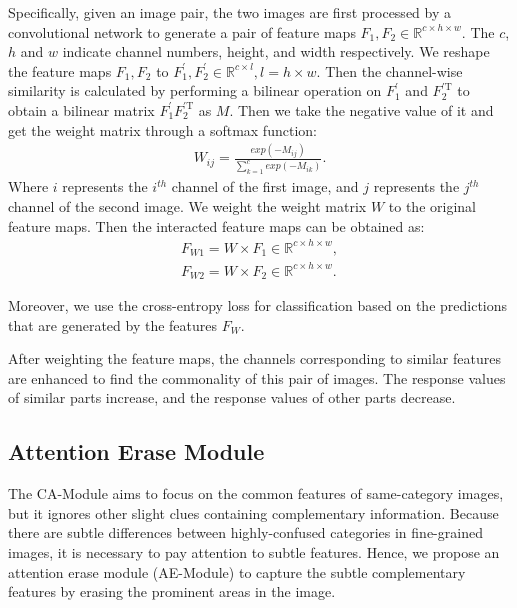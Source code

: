 \documentclass[conference]{IEEEtran}
\begin{document}
Specifically, given an image pair, the two images are first processed by a convolutional network to generate a pair of feature maps ${F_{1}, F_{2}} \in \mathbb{R}^{c\times h\times w}$. The $c$, $h$ and $w$ indicate channel numbers, height, and width respectively. We reshape the feature maps $F_{1}, F_{2}$  to  $F^{'}_{1}, F^{'}_{2}  \in \mathbb{R}^{c \times l},l=h \times w$. Then the channel-wise similarity is calculated by performing a bilinear operation on  $F^{'}_{1} $ and  $ F_{2}^ \mathrm{ 'T } $ to obtain a bilinear matrix $F^{'}_{1} F_{2}^ \mathrm{ 'T } $ as $M$. Then we take the negative value of it and get the weight matrix through a softmax function:
\begin{eqnarray}
W_{ij}=\frac{exp({-M}_{ij})}{\sum_{k=1}^{c} exp({-M}_{ik})}.
\end{eqnarray}
Where $i$ represents the $i^{th}$ channel of the first image, and $j$ represents the $j^{th}$ channel of the second image. We weight the weight matrix $W$ to the original feature maps. Then the interacted feature maps can be obtained as:
\begin{eqnarray}
F_{W1}= {W \times F_{1}}\in \mathbb{R}^{c \times h \times w}, \nonumber \\
F_{W2}= {W \times F_{2}}\in \mathbb{R}^{c \times h \times w}.
\end{eqnarray}

Moreover, we use the cross-entropy loss for classification based on the predictions that are generated by the features $F_{W}$.

After weighting the feature maps, the channels corresponding to similar features are enhanced to find the commonality of this pair of images. The response values of similar parts increase, and the response values of other parts decrease.



\subsection{Attention Erase Module}

The CA-Module aims to focus on the common features of same-category images, but it ignores other slight clues containing complementary information. Because there are subtle differences between highly-confused categories in fine-grained images, it is necessary to pay attention to subtle features. Hence, we propose an attention erase module (AE-Module) to capture the subtle complementary features by erasing the prominent areas in the image.
\end{document}
